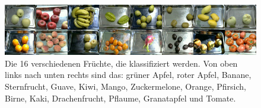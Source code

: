 \documentclass[a4,german]{article}
\begin{document}
\begin{figure}[b] %
\begin{center} %
\includegraphics[width=1\linewidth]{16fruits.png}
\caption{Die 16 verschiedenen Früchte, die klassifiziert werden. Von oben links nach unten rechts sind das: grüner Apfel, roter Apfel, Banane, Sternfrucht, Guave, Kiwi, Mango, Zuckermelone, Orange, Pfirsich, Birne, Kaki, Drachenfrucht, Pflaume, Granatapfel und Tomate.
\label{fig:16fruits} %
}
\end{center}
\end{figure}
\end{document}
